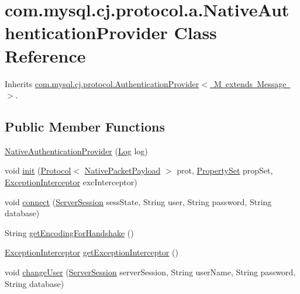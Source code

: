\hypertarget{classcom_1_1mysql_1_1cj_1_1protocol_1_1a_1_1_native_authentication_provider}{}\section{com.\+mysql.\+cj.\+protocol.\+a.\+Native\+Authentication\+Provider Class Reference}
\label{classcom_1_1mysql_1_1cj_1_1protocol_1_1a_1_1_native_authentication_provider}


Inherits \mbox{\hyperlink{interfacecom_1_1mysql_1_1cj_1_1protocol_1_1_authentication_provider}{com.\+mysql.\+cj.\+protocol.\+Authentication\+Provider$<$ M extends Message $>$}}.

\subsection*{Public Member Functions}
\begin{DoxyCompactItemize}
\item 
\mbox{\hyperlink{classcom_1_1mysql_1_1cj_1_1protocol_1_1a_1_1_native_authentication_provider_a3b9853ff4d45808557e5566bdbcd5d5d}{Native\+Authentication\+Provider}} (\mbox{\hyperlink{interfacecom_1_1mysql_1_1cj_1_1log_1_1_log}{Log}} log)
\item 
void \mbox{\hyperlink{classcom_1_1mysql_1_1cj_1_1protocol_1_1a_1_1_native_authentication_provider_aad4a7ad192dd22c533e5a4a8190c7776}{init}} (\mbox{\hyperlink{interfacecom_1_1mysql_1_1cj_1_1protocol_1_1_protocol}{Protocol}}$<$ \mbox{\hyperlink{classcom_1_1mysql_1_1cj_1_1protocol_1_1a_1_1_native_packet_payload}{Native\+Packet\+Payload}} $>$ prot, \mbox{\hyperlink{interfacecom_1_1mysql_1_1cj_1_1conf_1_1_property_set}{Property\+Set}} prop\+Set, \mbox{\hyperlink{interfacecom_1_1mysql_1_1cj_1_1exceptions_1_1_exception_interceptor}{Exception\+Interceptor}} exc\+Interceptor)
\item 
void \mbox{\hyperlink{classcom_1_1mysql_1_1cj_1_1protocol_1_1a_1_1_native_authentication_provider_a2293502a6ebd37746dcada2f4b0a9c23}{connect}} (\mbox{\hyperlink{interfacecom_1_1mysql_1_1cj_1_1protocol_1_1_server_session}{Server\+Session}} sess\+State, String user, String password, String database)
\item 
String \mbox{\hyperlink{classcom_1_1mysql_1_1cj_1_1protocol_1_1a_1_1_native_authentication_provider_a27c5a8cd7397eb15934b3b3048dc161d}{get\+Encoding\+For\+Handshake}} ()
\item 
\mbox{\hyperlink{interfacecom_1_1mysql_1_1cj_1_1exceptions_1_1_exception_interceptor}{Exception\+Interceptor}} \mbox{\hyperlink{classcom_1_1mysql_1_1cj_1_1protocol_1_1a_1_1_native_authentication_provider_aed374243b2af096a92fd54eb99300bf0}{get\+Exception\+Interceptor}} ()
\item 
void \mbox{\hyperlink{classcom_1_1mysql_1_1cj_1_1protocol_1_1a_1_1_native_authentication_provider_a5cf1296206b1d2ceb53440428a37d6f8}{change\+User}} (\mbox{\hyperlink{interfacecom_1_1mysql_1_1cj_1_1protocol_1_1_server_session}{Server\+Session}} server\+Session, String user\+Name, String password, String database)
\end{DoxyCompactItemize}
